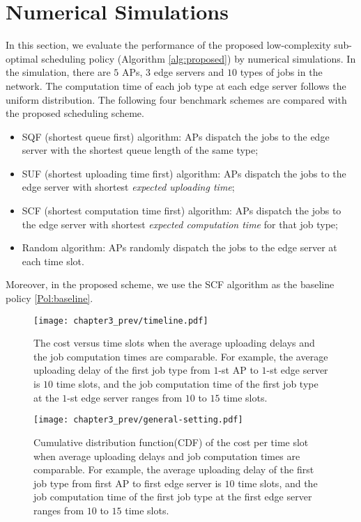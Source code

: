 \section{Numerical Simulations}
\label{sec:chapter3_prev-simulation}
In this section, we evaluate the performance of the proposed low-complexity sub-optimal scheduling policy (Algorithm \ref{alg:proposed}) by numerical simulations. In the simulation, there are $5$ APs, $3$ edge servers and $10$ types of jobs in the network. The computation time of each job type at each edge server follows the uniform distribution. The following four benchmark schemes are compared with the proposed scheduling scheme.
\begin{itemize}
    \item SQF (shortest queue first) algorithm: APs dispatch the jobs to the edge server with the shortest queue length of the same type;
    \item SUF (shortest uploading time first) algorithm: APs dispatch the jobs to the edge server with shortest \emph{expected uploading time};
    \item SCF (shortest computation time first) algorithm: APs dispatch the jobs to the edge server with shortest \emph{expected computation time} for that job type;
    \item Random algorithm: APs randomly dispatch the jobs to the edge server at each time slot.
\end{itemize}
Moreover, in the proposed scheme, we use the SCF algorithm as the baseline policy \ref{Pol:baseline}.

\begin{figure*}
    \centering
    \texttt{[image: chapter3\_prev/timeline.pdf]}
    \caption{The cost versus time slots when the average uploading delays and the job computation times are comparable. For example, the average uploading delay of the first job type from $1$-st AP to $1$-st edge server is $10$ time slots, and the job computation time of the first job type at the $1$-st edge server ranges from $10$ to $15$ time slots.}
    \label{fig:timeline}
\end{figure*}

\begin{figure*}
    \centering
    \texttt{[image: chapter3\_prev/general-setting.pdf]}
    \caption{Cumulative distribution function(CDF) of the cost per time slot when average uploading delays and job computation times are comparable. For example, the average uploading delay of the first job type from first AP to first edge server is $10$ time slots, and the job computation time of the first job type at the first edge server ranges from $10$ to $15$ time slots.}
    \label{fig:cdf1}
\end{figure*}

